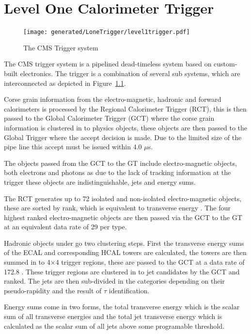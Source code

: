 \chapter{Level One Calorimeter Trigger} %
\label{cha:level_one_trigger}
\begin{figure}[ht]
  \centering
    \texttt{[image: generated/LoneTrigger/level1trigger.pdf]}
  \caption{The CMS \Lone Trigger system}
  \label{fig:figures_LoneTrigger_level1trigger}
\end{figure}


The CMS \Lone trigger system\cite{l1} is a pipelined dead-timeless system based on custom-built electronics.
The \Lone trigger is a combination of several sub systems, which are interconnected as depicted in
Figure~\ref{fig:figures_LoneTrigger_level1trigger}.

Corse grain information from the electro-magnetic, hadronic and forward calorimeters is processed by the Regional Calorimeter
Trigger (RCT), this is then passed to the Global Calorimeter Trigger (GCT) where the corse grain information is clustered in to
physics objects, these objects are then passed to the Global Trigger where the \Lone accept decision is made. Due to the limited
size of the pipe line this \Lone accept must be issued within 4.0 $\mu$s.

The objects passed from the GCT to the GT include electro-magnetic objects, both electrons and photons as due to the lack of
tracking information at the \Lone trigger these objects are indistinguishable, jets and energy sums.

The RCT generates up to 72 isolated and non-isolated electro-magnetic objects, these are sorted by rank, which is equivalent to
transverse energy \ET. The four highest ranked electro-magnetic objects are then passed via the GCT to the GT at an equivalent data 
rate of 29 \Gbs per type.

Hadronic objects under go two clustering steps. First the transverse energy sums of the ECAL and corresponding HCAL towers are
calculated, the towers are then summed in to 4$\times$4 trigger regions, these are passed to the GCT at a data rate of 172.8 \Gbs.
These trigger regions are clustered in to jet candidates by the GCT and ranked. The jets are then sub-divided in the 
categories depending on their pseudo-rapidity and the result of $\tau$ identification. 

Energy sums come in two forms, the total transverse energy \ET which is the scalar sum of all transverse energies and the total 
jet transverse energy \HT which is calculated as the scalar sum of all jets above some programable threshold.

